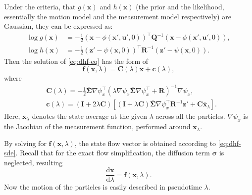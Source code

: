 Under the criteria, that $g(\mathbf{x})$ and $h(\mathbf{x})$ (the prior and the likelihood, essentially the motion model and the measurement model respectively) are Gaussian,
they can be expressed as:
\begin{align}
    \log g(\mathbf{x}) & =-\frac{1}{2}(\mathbf{x}-\phi(\mathbf{x}',\mathbf{u}',0))^{\top} \mathbf{Q}^{-1}(\mathbf{x}-\phi(\mathbf{x}',\mathbf{u}',0)),            \\
    \log h(\mathbf{x}) & =-\frac{1}{2}(\mathbf{z}'-\psi(\mathbf{x},0))^{\top} \mathbf{R}^{-1}(\mathbf{z}'-\psi(\mathbf{x},0)). \label{eq:explicit-log-likelihood}
\end{align}
Then the solution of \eqref{eq:dhf-eq} has the form of
\begin{equation}\label{eq:edh-flow-vector}
    \mathbf{f}(\mathbf{x},\lambda) = \mathbf{C}(\lambda)\mathbf{x} + \mathbf{c}(\lambda),
\end{equation}
where
\begin{align}
     & \mathbf{C}(\lambda) = -\frac{1}{2}\mathbf{\mathbf{\overline\Sigma}}\nabla \psi_x^\top\left(\lambda \nabla \psi_x\mathbf{\overline\Sigma}\nabla \psi_x^\top + \mathbf{R}\right)^{-1}\nabla \psi_x,\label{eq:edh-C}                                      \\
     & \mathbf{c}(\lambda) = \left(\mathbf{I}+2\lambda\mathbf{C}\right)\left[\left(\mathbf{I}+\lambda\mathbf{C}\right)\mathbf{\overline\Sigma}\nabla \psi_x^\top\mathbf{R}^{-1}\mathbf{z}' + \mathbf{C}\overline{\mathbf{x}}_\lambda\right]. \label{eq:edh-c}
\end{align}
Here, $\overline{\mathbf{x}}_\lambda$ denotes the state average at the given $\lambda$ across all the particles. $\nabla \psi_x$ is the Jacobian of the measurement function, performed around $\overline{\mathbf{x}}_\lambda$.

By solving for $\mathbf{f}(\mathbf{x},\lambda)$,
the state flow vector is obtained according to \eqref{eq:dhf-sde}.
Recall that for the exact flow simplification, the diffusion term $\boldsymbol\sigma$ is
neglected, resulting
\begin{equation}
    \frac{\mathrm{d}\mathbf{x}}{\mathrm{d}\lambda} = \mathbf{f}(\mathbf{x},\lambda).
\end{equation}
Now the motion of the particles is easily described in pseudotime $\lambda$.

